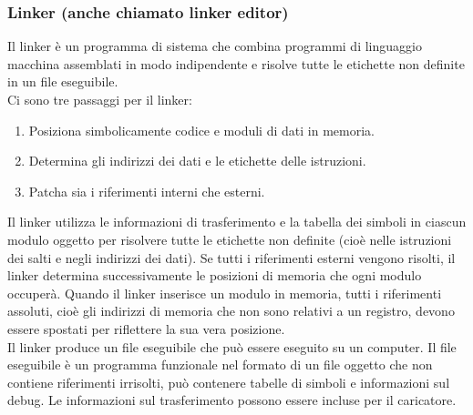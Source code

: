 \documentclass[12pt,a4paper]{article}
\begin{document}
\subsubsection{Linker (anche chiamato linker editor)}
Il linker è un programma di sistema che combina programmi di linguaggio macchina assemblati in modo indipendente e risolve tutte le etichette non definite in un file eseguibile.\\
Ci sono tre passaggi per il linker:
\begin{enumerate}
\item Posiziona simbolicamente codice e moduli di dati in memoria.
\item Determina gli indirizzi dei dati e le etichette delle istruzioni.
\item Patcha sia i riferimenti interni che esterni.
\end{enumerate}
Il linker utilizza le informazioni di trasferimento e la tabella dei simboli in ciascun modulo oggetto per risolvere tutte le etichette non definite (cioè nelle istruzioni dei salti e negli indirizzi dei dati). Se tutti i riferimenti esterni vengono risolti, il linker determina successivamente le posizioni di memoria che ogni modulo occuperà. Quando il linker inserisce un modulo in memoria, tutti i riferimenti assoluti, cioè gli indirizzi di memoria che non sono relativi a un registro, devono essere spostati per riflettere la sua vera posizione.\\
Il linker produce un file eseguibile che può essere eseguito su un computer. Il file eseguibile è un programma funzionale nel formato di un file oggetto che non contiene riferimenti irrisolti, può contenere tabelle di simboli e informazioni sul debug. Le informazioni sul trasferimento possono essere incluse per il caricatore.
\end{document}
